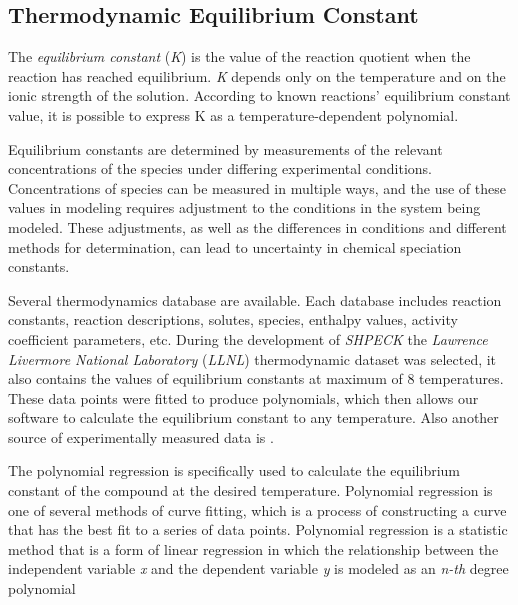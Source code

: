 \subsection{Thermodynamic Equilibrium Constant}
The \emph{equilibrium constant} (\emph{K}) is the value of the reaction quotient when the reaction has reached equilibrium. \emph{K} depends only on the temperature and on the ionic strength of the solution. According to known reactions' equilibrium constant value, it is possible to express K as a  temperature-dependent polynomial.

Equilibrium constants are determined by measurements of the relevant concentrations of the species under differing experimental conditions. Concentrations of species can be measured in multiple ways, and the use of these values in modeling requires adjustment to the conditions in the system being modeled. These adjustments, as well as the differences in conditions and different methods for determination, can lead to uncertainty in chemical speciation constants.

Several thermodynamics database are available. Each database includes reaction constants, reaction descriptions, solutes, species, enthalpy values, activity coefficient parameters, etc. During the development of \emph{SHPECK} the \emph{Lawrence Livermore National Laboratory} (\emph{LLNL}) thermodynamic dataset  was selected, it also contains the values of equilibrium constants at maximum of 8 temperatures. These data points were fitted to produce polynomials, which then allows our software to calculate the equilibrium constant to any temperature. Also another source of experimentally measured data is \cite{Palandri:04}.

The polynomial regression is specifically used to calculate the equilibrium constant of the compound at the desired temperature. Polynomial regression is one of several methods of curve fitting, which is a process of constructing a curve that has the best fit to a series of data points. Polynomial regression is a statistic method that is a form of linear regression in which the relationship between the independent variable \emph{x} and the dependent variable \emph{y} is modeled as an \emph{n-th} degree polynomial



